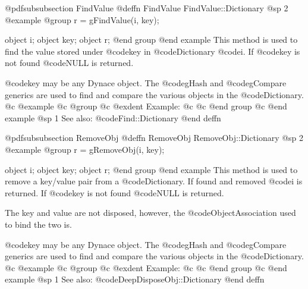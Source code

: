 @pdfsubsubsection {FindValue}
@deffn {FindValue} FindValue::Dictionary
@sp 2
@example
@group
r = gFindValue(i, key);

object  i;
object  key;
object  r;
@end group
@end example
This method is used to find the value stored under @code{key} in
@code{Dictionary} @code{i}.  If @code{key} is not found @code{NULL} is
returned.

@code{key} may be any Dynace object.  The @code{gHash} and
@code{gCompare} generics are used to find and compare the various
objects in the @code{Dictionary}.
@c @example
@c @group
@c @exdent Example:
@c 
@c @end group
@c @end example
@sp 1
See also:  @code{Find::Dictionary}
@end deffn










@pdfsubsubsection {RemoveObj}
@deffn {RemoveObj} RemoveObj::Dictionary
@sp 2
@example
@group
r = gRemoveObj(i, key);

object  i;
object  key;
object  r;
@end group
@end example
This method is used to remove a key/value pair from a @code{Dictionary}.
If found and removed @code{i} is returned.  If @code{key} is not found
@code{NULL} is returned.

The key and value are not disposed, however, the @code{ObjectAssociation} used
to bind the two is.

@code{key} may be any Dynace object.  The @code{gHash} and
@code{gCompare} generics are used to find and compare the various
objects in the @code{Dictionary}.
@c @example
@c @group
@c @exdent Example:
@c 
@c @end group
@c @end example
@sp 1
See also:  @code{DeepDisposeObj::Dictionary}
@end deffn






